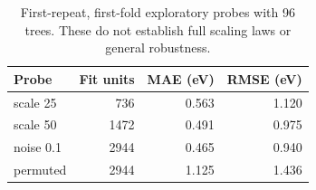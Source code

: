 \begin{table}[htbp]\centering\small
\caption{First-repeat, first-fold exploratory probes with 96 trees. These do not establish full scaling laws or general robustness.}
\begin{tabular}{lrrr}
\toprule
Probe & Fit units & MAE (eV) & RMSE (eV) \\
\midrule
scale 25 & 736 & 0.563 & 1.120 \\
scale 50 & 1472 & 0.491 & 0.975 \\
noise 0.1 & 2944 & 0.465 & 0.940 \\
permuted & 2944 & 1.125 & 1.436 \\
\bottomrule
\end{tabular}\end{table}
